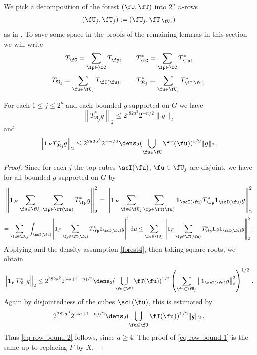We pick a decomposition of the forest $(\fU, \fT)$ into $2^n$ $n$-rows
\begin{equation*}
(\fU_j, \fT_j) := (\fU_j, \fT|_{\fU_j})
\end{equation*}
as in . To save some space in the proofs of the remaining lemmas in this section we will write
    $$
        T_{\fC} = \sum_{\fp \in \fC} T_{\fp},\qquad T_{\fC}^* = \sum_{\fp \in \fC} T_{\fp}^*,
    $$
    $$
        T_{\mathfrak{R}_j} = \sum_{\fu \in \fU_j} T_{\fT(\fu)},\qquad T_{\mathfrak{R}_j}^* = \sum_{\fu \in \fU_j} T_{\fT(\fu)}^*.
    $$
\begin{lemma}
    \label{row-bound}
    \leanok
    For each $1 \le j \le 2^n$ and each bounded $g$ supported on $G$ we have
    \begin{equation}
        \label{eq-row-bound-1}
        \left\| T_{\mathfrak{R}_j}^*g \right\|_2 \le 2^{182a^3} 2^{-n/2} \|g\|_2
    \end{equation}
    and
    \begin{equation}
        \label{eq-row-bound-2}
        \left\| \mathbf{1}_F T_{\mathfrak{R}_j}^*g \right\|_2 \le 2^{283a^3} 2^{-n/2} \dens_2(\bigcup_{\fu\in \fU}\fT(\fu))^{1/2} \|g\|_2\,.
    \end{equation}
\end{lemma}

\begin{proof}
    \leanok
    Since for each $j$ the top cubes $\scI(\fu)$, $\fu \in \fU_j$ are disjoint, we have for all bounded $g$ supported on $G$ by 
    $$
        \left\|\mathbf{1}_F \sum_{\fu \in \fU_j} \sum_{\fp \in \fT(\fu)} T_{\fp}^* g\right\|_2^2 = \left\|\mathbf{1}_F \sum_{\fu \in \fU_j} \sum_{\fp \in \fT(\fu)} \mathbf{1}_{\scI(\fu)} T_{\fp}^* \mathbf{1}_{\scI(\fu)} g\right\|_2^2
    $$
    $$
        = \sum_{\fu \in \fU_j} \int_{\scI(\fu)} \left| \mathbf{1}_F \sum_{\fp \in \fT(\fu)} T_{\fp}^* \mathbf{1}_{\scI(\fu)} g\right|^2 \, \mathrm{d}\mu
        \le \sum_{\fu \in \fU_j} \left\|\mathbf{1}_F \sum_{\fp \in \fT(\fu)} T_{\fp}^* \mathbf{1}_G \mathbf{1}_{\scI(\fu)}  g\right\|_2^2\,.
    $$
    Applying  and the density assumption \eqref{forest4}, then taking square roots, we obtain
    $$
        \left\| \mathbf{1}_F T_{\mathfrak{R}_j}^*g \right\|_2 \le 2^{282a^3} 2^{(4a+1-n)/2} \dens_2(\bigcup_{\fu\in \fU}\fT(\fu))^{1/2} \left( \sum_{\fu \in \fU_j} \left\| \mathbf{1}_{\scI(\fu)} g\right\|_2^2 \right)^{1/2}\,.
    $$
    Again by disjointedness of the cubes $\scI(\fu)$, this is estimated by
    $$
        2^{282a^3} 2^{(4a+1-n)/2} \dens_2(\bigcup_{\fu\in \fU}\fT(\fu))^{1/2} \|g\|_2\,.
    $$
    Thus \eqref{eq-row-bound-2} follows, since $a \ge 4$. The proof of \eqref{eq-row-bound-1} is the same up to replacing $F$ by $X$.
\end{proof}


